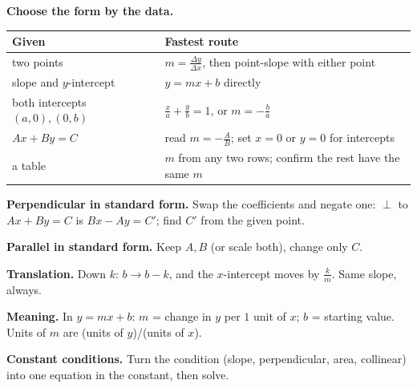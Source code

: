 \documentclass[10pt]{article}
\begin{document}
\textbf{Choose the form by the data.}
\begin{center}\begin{tabular}{@{}ll@{}}\toprule
Given & Fastest route\\\midrule
two points & $m=\frac{\Delta y}{\Delta x}$, then point-slope with either point\\
slope and $y$-intercept & $y=mx+b$ directly\\
both intercepts $(a,0),(0,b)$ & $\frac xa+\frac yb=1$, or $m=-\frac ba$\\
$Ax+By=C$ & read $m=-\frac AB$; set $x=0$ or $y=0$ for intercepts\\
a table & $m$ from any two rows; confirm the rest have the same $m$\\\bottomrule\end{tabular}\end{center}

\textbf{Perpendicular in standard form.} Swap the coefficients and negate one: $\perp$ to $Ax+By=C$ is $Bx-Ay=C'$; find $C'$ from the given point.

\textbf{Parallel in standard form.} Keep $A,B$ (or scale both), change only $C$.

\textbf{Translation.} Down $k$: $b\to b-k$, and the $x$-intercept moves by $\frac km$. Same slope, always.

\textbf{Meaning.} In $y=mx+b$: $m$ = change in $y$ per $1$ unit of $x$; $b$ = starting value. Units of $m$ are (units of $y$)/(units of $x$).

\textbf{Constant conditions.} Turn the condition (slope, perpendicular, area, collinear) into one equation in the constant, then solve.
\end{document}
